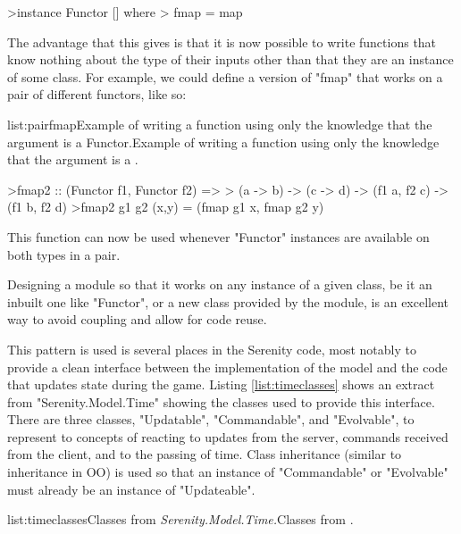 \begin{haskell}
>instance Functor [] where
>  fmap = map

\end{haskell}
\noindent The advantage that this gives is that it is now possible to write functions that know nothing about the type of their inputs other than that they are an instance of some class. For example, we could define a version of "fmap" that works on a pair of different functors, like so:

\vspace{-0.5em}
\begin{listing}{list:pairfmap}{Example of writing a function using only the knowledge that the argument is a Functor.}{Example of writing a function using only the knowledge that the argument is a .}{}
\end{listing}\vspace{-1.5em}

\begin{haskell}
>fmap2 :: (Functor f1, Functor f2) => 
>  (a -> b) -> (c -> d) -> (f1 a, f2 c) -> (f1 b, f2 d)
>fmap2 g1 g2 (x,y) = (fmap g1 x, fmap g2 y)

\end{haskell}
\noindent This function can now be used whenever "Functor" instances are available on both types in a pair.

Designing a module so that it works on any instance of a given class, be it an inbuilt one like "Functor", or a new class provided by the module, is an excellent way to avoid coupling and allow for code reuse.

This pattern is used is several places in the Serenity code, most notably to provide a clean interface between the implementation of the model and the code that updates state during the game. Listing \ref{list:timeclasses} shows an extract from "Serenity.Model.Time" showing the classes used to provide this interface. There are three classes, "Updatable", "Commandable", and "Evolvable", to represent to concepts of reacting to updates from the server, commands received from the client, and to the passing of time. Class inheritance (similar to inheritance in OO) is used so that an instance of "Commandable" or "Evolvable" must already be an instance of "Updateable".

\vspace{-0.5em}
\begin{listing}{list:timeclasses}{Classes from \emph{Serenity.Model.Time.}}{Classes from .}{}
\end{listing}\vspace{-1.5em}


